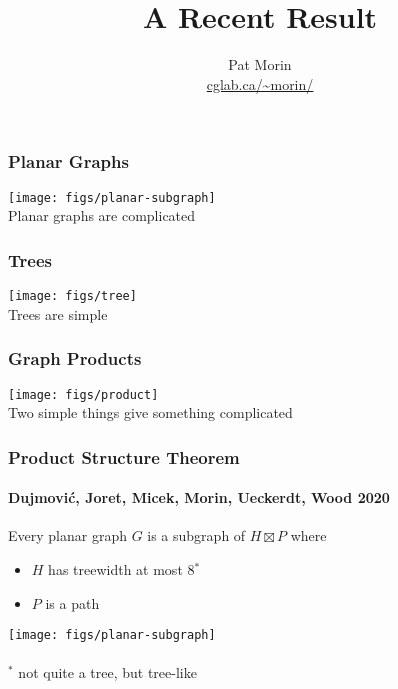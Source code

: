 \documentclass[xcolor=dvipsnames]{beamer}
\title[Graph Product Structure]{A Recent Result}
\author[Pat Morin]{Pat Morin \\ \url{cglab.ca/~morin/}}
\begin{document}
\begin{frame}
  \titlepage
\end{frame}


\begin{frame}
\frametitle{Planar Graphs}

\begin{center}
    \texttt{[image: figs/planar-subgraph]} \\
    Planar graphs are complicated
\end{center}
\end{frame}


\begin{frame}
\frametitle{Trees}

\begin{center}
    \texttt{[image: figs/tree]} \\
    Trees are simple
\end{center}
\end{frame}


\begin{frame}
\frametitle{Graph Products}

\begin{center}
    \texttt{[image: figs/product]} \\
    Two simple things give something complicated
\end{center}
\end{frame}


\begin{frame}
\frametitle{Product Structure Theorem}
\framesubtitle{Dujmović, Joret, Micek, Morin, Ueckerdt, Wood 2020}

Every planar graph $G$ is a subgraph of $H\boxtimes P$ where
\begin{itemize}
    \item $H$ has treewidth at most 8$^*$
    \item $P$ is a path
\end{itemize}
    \texttt{[image: figs/planar-subgraph]} \raisebox{.11\textwidth}{$\subseteq$}
    \\
 \\[3ex]

    $^*$ not quite a tree, but tree-like
\end{frame}
\end{document}
